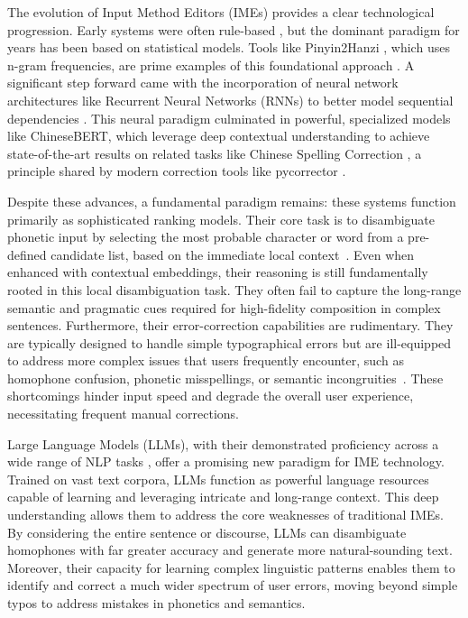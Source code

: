 \documentclass[10pt, a4paper]{article}
\begin{document}
The evolution of Input Method Editors (IMEs) provides a clear technological progression. Early systems were often rule-based \citep{goh2005}, but the dominant paradigm for years has been based on statistical models. Tools like {Pinyin2Hanzi} \citep{pinyin2hanzi}, which uses n-gram frequencies, are prime examples of this foundational approach \citep{gao2002improving}. A significant step forward came with the incorporation of neural network architectures like Recurrent Neural Networks (RNNs) to better model sequential dependencies \citep{chen2015neural}. This neural paradigm culminated in powerful, specialized models like ChineseBERT, which leverage deep contextual understanding to achieve state-of-the-art results on related tasks like Chinese Spelling Correction \citep{sun2021chinesebert}, a principle shared by modern correction tools like {pycorrector} \citep{pycorrector}. 

Despite these advances, a fundamental paradigm remains: these systems function primarily as sophisticated ranking models. Their core task is to disambiguate phonetic input by selecting the most probable character or word from a pre-defined candidate list, based on the immediate local context~\citep{sun2021chinesebert,chen2015neural}. Even when enhanced with contextual embeddings, their reasoning is still fundamentally rooted in this local disambiguation task. They often fail to capture the long-range semantic and pragmatic cues required for high-fidelity composition in complex sentences.
Furthermore, their error-correction capabilities are rudimentary. They are typically designed to handle simple typographical errors but are ill-equipped to address more complex issues that users frequently encounter, such as homophone confusion, phonetic misspellings, or semantic incongruities~\citep{tseng2015introduction}. These shortcomings hinder input speed and degrade the overall user experience, necessitating frequent manual corrections.

Large Language Models (LLMs), with their demonstrated proficiency across a wide range of NLP tasks \citep{bommasani2021opportunities, zhao2023survey, zhou2023comprehensive}, offer a promising new paradigm for IME technology. Trained on vast text corpora, LLMs function as powerful language resources capable of learning and leveraging intricate and long-range context. This deep understanding allows them to address the core weaknesses of traditional IMEs. By considering the entire sentence or discourse, LLMs can disambiguate homophones with far greater accuracy and generate more natural-sounding text. Moreover, their capacity for learning complex linguistic patterns enables them to identify and correct a much wider spectrum of user errors, moving beyond simple typos to address mistakes in phonetics and semantics.
\end{document}
